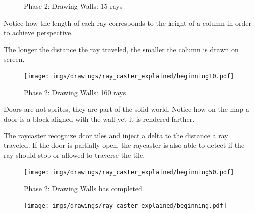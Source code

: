 \begin{figure}[H]
 \centering
  \caption{Phase 2: Drawing Walls: 15 rays} 
\end{figure}
\begin{minipage}{.4\textwidth}
Notice how the length of each ray corresponds to the height of a column in order to achieve perspective.\\
\par
The longer the distance the ray traveled, the smaller the column is drawn on screen.
 \end{minipage}
\begin{minipage}{.6\textwidth}
\begin{figure}[H]
  \centering
 \texttt{[image: imgs/drawings/ray\_caster\_explained/beginning10.pdf]}
   
\end{figure}
\end{minipage}




 
\begin{figure}[H]
 \centering
 \caption{Phase 2: Drawing Walls: 160 rays}  
\end{figure}
 \begin{minipage}{.4\textwidth}
 Doors are not sprites, they are part of the solid world. Notice how on the map a door is a block aligned with the wall yet it is rendered farther.\\
 \par
 The raycaster recognize door tiles and inject a delta to the distance a ray traveled. If the door is partially open, the raycaster is also able to detect if the ray should stop or allowed to traverse the tile.
 \end{minipage}
\begin{minipage}{.6\textwidth}
\begin{figure}[H]
  \centering
 \texttt{[image: imgs/drawings/ray\_caster\_explained/beginning50.pdf]}
   
\end{figure}
\end{minipage}



 
 \begin{figure}[H]
\centering
 \caption{Phase 2: Drawing Walls has completed.} 
 \end{figure}
\begin{minipage}{\textwidth}
\begin{figure}[H]
  \centering
 \texttt{[image: imgs/drawings/ray\_caster\_explained/beginning.pdf]}
   
\end{figure}
\end{minipage}





